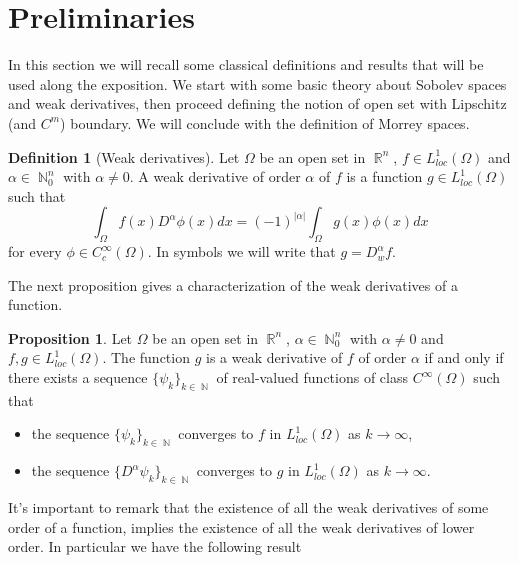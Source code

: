 \documentclass[12pt]{article}
\theoremstyle{definition}
\newtheorem{definition}{Definition}
\newtheorem{prop}{Proposition}
\DeclareMathOperator\rr{\mathbb{R}}
\DeclareMathOperator\nn{\mathbb{N}}
\begin{document}
\section{Preliminaries}
In this section we will recall some classical definitions and results that will be used along the exposition. We start with some basic theory about Sobolev spaces and weak derivatives, then proceed defining the notion of open set with Lipschitz (and $C^m$) boundary. We will conclude with the definition of Morrey spaces. 
\begin{definition}[Weak derivatives]
	Let $\Omega$ be an open set in $\rr^n$, $f \in L^1_{loc}(\Omega)$ and  $\alpha\in \nn^n_0$ with $\alpha \neq 0.$ A weak derivative of order $\alpha$ of $f$ is a function $g \in L^1_{loc}(\Omega)$ such that
	\[\int_\Omega f(x)D^\alpha\phi(x)dx=(-1)^{|\alpha|} \int_\Omega g(x)\phi(x)dx\]
	for every $\phi \in C_c^\infty(\Omega).$ In symbols we will write that $g=D^\alpha_wf.$
\end{definition}
The next proposition gives a characterization of the weak derivatives of a function.
\begin{prop}\label{weak2}
	Let $\Omega$ be an open set in $\rr^n$, $\alpha \in \nn^n_0$ with $\alpha \neq 0$ and $f,g \in L^1_{loc}(\Omega).$ The function $g$ is a weak derivative of $f$ of order $\alpha$ if and only if there exists a sequence $\{\psi_k\}_{k\in\nn}$ of real-valued functions of class $C^\infty(\Omega)$ such that 
	\begin{itemize}
		\item the sequence $\{\psi_k\}_{k\in\nn}$ converges to $f$ in $L^1_{loc}(\Omega)$ as $k \to \infty$,
		\item the sequence $\{D^\alpha\psi_k\}_{k\in \nn}$ converges to $g$ in $L^1_{loc}(\Omega)$ as $k \to \infty$.
	\end{itemize}
\end{prop}
It's important to remark that the existence of all the weak derivatives of some order of a function, implies the existence of all the weak derivatives of lower order. In particular we have the following result
\end{document}
